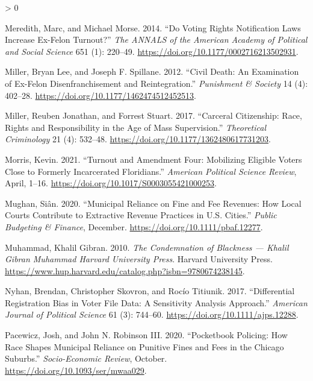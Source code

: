 \documentclass[
  12pt,
]{article}
\newlength{\cslhangindent}
\newenvironment{CSLReferences}[2] %
 {%
  \setlength{\parindent}{0pt}
  \ifodd #1 \everypar{\setlength{\hangindent}{\cslhangindent}}\ignorespaces\fi
  \ifnum #2 > 0
  \setlength{\parskip}{#2\baselineskip}
  \fi
 }%
 {}
\begin{document}
\begin{CSLReferences}{1}{0}
\leavevmode\hypertarget{ref-Meredith2014}{}%
Meredith, Marc, and Michael Morse. 2014. {``Do {Voting Rights Notification Laws Increase Ex}-{Felon Turnout}?''} \emph{The ANNALS of the American Academy of Political and Social Science} 651 (1): 220--49. \url{https://doi.org/10.1177/0002716213502931}.

\leavevmode\hypertarget{ref-Miller2012}{}%
Miller, Bryan Lee, and Joseph F. Spillane. 2012. {``Civil Death: {An} Examination of Ex-Felon Disenfranchisement and Reintegration.''} \emph{Punishment \& Society} 14 (4): 402--28. \url{https://doi.org/10.1177/1462474512452513}.

\leavevmode\hypertarget{ref-Miller2017}{}%
Miller, Reuben Jonathan, and Forrest Stuart. 2017. {``Carceral {Citizenship}: {Race}, {Rights} and {Responsibility} in the {Age} of {Mass Supervision}.''} \emph{Theoretical Criminology} 21 (4): 532--48. \url{https://doi.org/10.1177/1362480617731203}.

\leavevmode\hypertarget{ref-Morris2021}{}%
Morris, Kevin. 2021. {``Turnout and {Amendment Four}: {Mobilizing Eligible Voters Close} to {Formerly Incarcerated Floridians}.''} \emph{American Political Science Review}, April, 1--16. \url{https://doi.org/10.1017/S0003055421000253}.

\leavevmode\hypertarget{ref-Mughan2020}{}%
Mughan, Siân. 2020. {``Municipal {Reliance} on {Fine} and {Fee Revenues}: {How Local Courts Contribute} to {Extractive Revenue Practices} in {U}.{S}. {Cities}.''} \emph{Public Budgeting \& Finance}, December. \url{https://doi.org/10.1111/pbaf.12277}.

\leavevmode\hypertarget{ref-Muhammad2010}{}%
Muhammad, Khalil Gibran. 2010. \emph{The {Condemnation} of {Blackness} --- {Khalil Gibran Muhammad} \textbar{} {Harvard University Press}}. {Harvard University Press}. \url{https://www.hup.harvard.edu/catalog.php?isbn=9780674238145}.

\leavevmode\hypertarget{ref-Nyhan2017}{}%
Nyhan, Brendan, Christopher Skovron, and Rocío Titiunik. 2017. {``Differential {Registration Bias} in {Voter File Data}: {A Sensitivity Analysis Approach}.''} \emph{American Journal of Political Science} 61 (3): 744--60. \url{https://doi.org/10.1111/ajps.12288}.

\leavevmode\hypertarget{ref-Pacewicz2020}{}%
Pacewicz, Josh, and John N. Robinson III. 2020. {``Pocketbook Policing: {How} Race Shapes Municipal Reliance on Punitive Fines and Fees in the {Chicago} Suburbs.''} \emph{Socio-Economic Review}, October. \url{https://doi.org/10.1093/ser/mwaa029}.


\end{CSLReferences}
\end{document}

